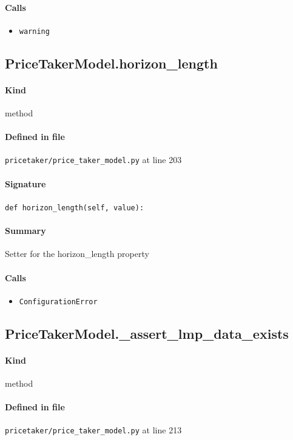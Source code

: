 \documentclass[11pt]{report}
\begin{document}
\paragraph{Calls}
\begin{itemize}[leftmargin=*]
  \item \texttt{warning}
\end{itemize}
\subsection{PriceTakerModel.horizon\_length}
\label{def:pricetaker-price_taker_model.py:PriceTakerModel.horizon_length:L203}
\paragraph{Kind} method
\paragraph{Defined in file} \texttt{pricetaker/price\_taker\_model.py} at line 203
\paragraph{Signature} \texttt{def horizon\_length(self, value):}
\paragraph{Summary} Setter for the horizon\_length property
\paragraph{Calls}
\begin{itemize}[leftmargin=*]
  \item \texttt{ConfigurationError}
\end{itemize}
\subsection{PriceTakerModel.\_assert\_lmp\_data\_exists}
\label{def:pricetaker-price_taker_model.py:PriceTakerModel._assert_lmp_data_exists:L213}
\paragraph{Kind} method
\paragraph{Defined in file} \texttt{pricetaker/price\_taker\_model.py} at line 213
\end{document}
